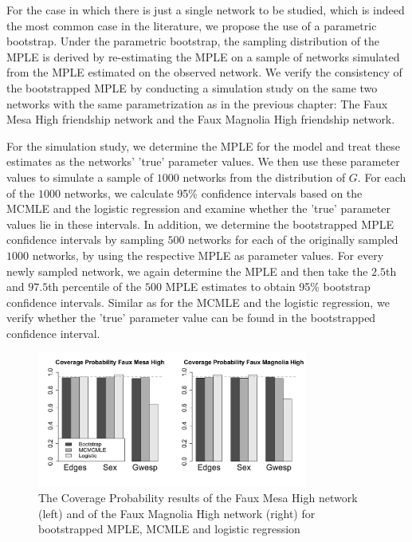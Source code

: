 \documentclass{llncs}
\begin{document}
For the case in which there is just a single network to be studied, which is indeed the most common case in the literature, we propose the use of a parametric bootstrap. Under the parametric bootstrap, the sampling distribution of the MPLE is derived by re-estimating the MPLE on a sample of networks simulated from the MPLE estimated on the observed network. We verify the consistency of the bootstrapped MPLE by conducting a simulation study on the same two networks with the same parametrization as in the previous chapter: The Faux Mesa High friendship network and the Faux Magnolia High friendship network. 

For the simulation study, we determine the MPLE for the model and treat these estimates as the networks' 'true' parameter values. We then use these parameter values to simulate a sample of $1000$ networks from the distribution of $G$. For each of the $1000$ networks, we calculate 95\% confidence intervals based on the MCMLE and the logistic regression and examine whether the 'true' parameter values lie in these intervals. In addition, we determine the bootstrapped MPLE confidence intervals by sampling $500$ networks for each of the originally sampled $1000$ networks, by using the respective MPLE as parameter values. For every newly sampled network, we again determine the MPLE and then take the $2.5$th and $97.5$th percentile of the $500$ MPLE estimates to obtain  95\% bootstrap confidence intervals. Similar as for the MCMLE and the logistic regression, we verify whether the 'true' parameter value can be found in the bootstrapped confidence interval. 
\begin{figure}[!t]
\centering
\includegraphics[width=3.5in]{Coverage_Mesa_Magnolia_height05}
\caption{The Coverage Probability results of the Faux Mesa High network (left) and of the Faux Magnolia High network (right) for bootstrapped MPLE, MCMLE and logistic regression}
\label{coverage}
\end{figure}
\end{document}
